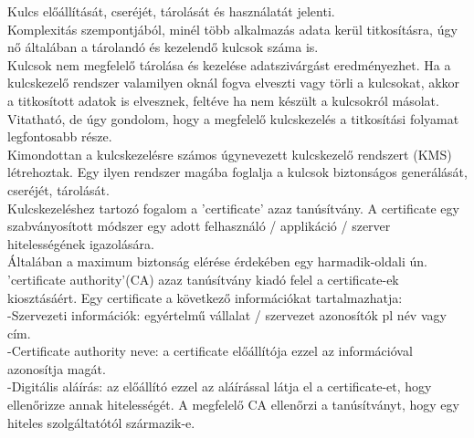 Kulcs előállítását, cseréjét, tárolását és használatát jelenti.
\vspace{5pt} \\Komplexitás szempontjából, minél több alkalmazás adata kerül titkosításra, úgy nő általában a tárolandó és kezelendő kulcsok száma is.
\vspace{5pt} \\Kulcsok nem megfelelő tárolása és kezelése adatszivárgást eredményezhet. Ha a kulcskezelő rendszer valamilyen oknál fogva elveszti vagy törli a kulcsokat, akkor a titkosított adatok is elvesznek, feltéve ha nem készült a kulcsokról másolat.
\vspace{5pt} \\Vitatható, de úgy gondolom, hogy a megfelelő kulcskezelés a titkosítási folyamat legfontosabb része.
\vspace{5pt} \\Kimondottan a kulcskezelésre számos úgynevezett kulcskezelő rendszert (KMS) létrehoztak. Egy ilyen rendszer magába foglalja a kulcsok biztonságos generálását, cseréjét, tárolását.
\vspace{5pt} \\Kulcskezeléshez tartozó fogalom a ’certificate’ azaz tanúsítvány. A certificate egy szabványosított módszer egy adott felhasználó / applikáció / szerver hitelességének igazolására.
\vspace{5pt} \\Általában a maximum biztonság elérése érdekében egy harmadik-oldali ún. ’certificate authority’(CA) azaz tanúsítvány kiadó felel a certificate-ek kiosztásáért. Egy certificate a következő információkat tartalmazhatja:
\vspace{5pt} \\-Szervezeti információk: egyértelmű vállalat / szervezet azonosítók pl név vagy cím.
\vspace{5pt} \\-Certificate authority neve: a certificate előállítója ezzel az információval azonosítja magát.
\vspace{5pt} \\-Digitális aláírás: az előállító ezzel az aláírással látja el a certificate-et, hogy ellenőrizze annak hitelességét. A megfelelő CA ellenőrzi a tanúsítványt, hogy egy hiteles szolgáltatótól származik-e.








